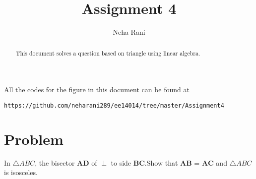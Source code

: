 \documentclass[journal,12pt,twocolumn]{IEEEtran}
\begin{document}
\makeatletter
{}
\makeatother
\let\StandardTheFigure\thefigure
\let\vec\mathbf
\renewcommand{\thefigure}{\theproblem}
\def\putbox#1#2#3{\makebox[0in][l]{\makebox[#1][l]{}\raisebox{\baselineskip}[0in][0in]{\raisebox{#2}[0in][0in]{#3}}}}
     \def\rightbox#1{\makebox[0in][r]{#1}}
     \def\centbox#1{\makebox[0in]{#1}}
     \def\topbox#1{\raisebox{-\baselineskip}[0in][0in]{#1}}
     \def\midbox#1{\raisebox{-0.5\baselineskip}[0in][0in]{#1}}
\vspace{3cm}
\title{Assignment 4}
\author{Neha Rani}
\maketitle
\newpage
\bigskip
\renewcommand{\thefigure}{\theenumi}
\renewcommand{\thetable}{\theenumi}
\begin{abstract}
This document solves a question based on triangle using linear algebra.
\end{abstract}
All the codes for the figure in this document can be found at
\begin{lstlisting}
https://github.com/neharani289/ee14014/tree/master/Assignment4
\end{lstlisting}
\section{Problem}
In $\triangle{ABC}$, the bisector $\vec{AD}$ of
      $\perp$  to side $\vec{BC}$.Show that $\vec{AB}$ = $\vec{AC}$ and $\triangle{ABC}$ is isosceles.
\end{document}
